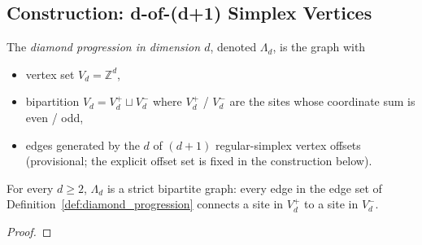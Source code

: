 
\label{sec:lattice_n_dim}


\subsection{Construction: d-of-(d+1) Simplex Vertices}
\label{subsec:diamond_progression_construction}


\begin{definition}
\label{def:diamond_progression}
The \emph{diamond progression in dimension $d$}, denoted
$\Lambda_d$, is the graph with

\begin{itemize}
\item vertex set $V_d = \mathbb{Z}^d$,
\item bipartition $V_d = V_d^+ \sqcup V_d^-$ where $V_d^+$ /
   $V_d^-$ are the sites whose coordinate sum is even / odd,
\item edges generated by the $d$ of $(d+1)$ regular-simplex vertex
   offsets (provisional; the explicit offset set is fixed in the
   construction below).
\end{itemize}
\end{definition}

\begin{proposition}
\label{prop:diamond_progression_bipartite}
For every $d \geq 2$, $\Lambda_d$ is a strict bipartite graph:
every edge in the edge set of
Definition~\ref{def:diamond_progression} connects a site in
$V_d^+$ to a site in $V_d^-$.
\end{proposition}

\begin{proof}
\end{proof}

